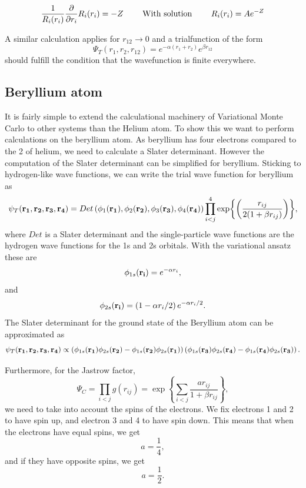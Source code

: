 \documentclass[11pt]{article}
\begin{document}
		\begin{align}
			 \frac{1}{R_i(r_i)} \pdv{}{r_i} R_i(r_i)	=  -Z  \qquad{ \text{ With solution }}  \qquad R_i(r_i) = A e^{-Z}
		\end{align}

		A similar calculation applies for \(r_{12} \rightarrow 0\) and a trialfunction of the form   \[\Psi_T(r_1,r_2,r_{12}) = e^{-\alpha (r_1 + r_2)} e^{\beta r_{12}} \] should fulfill the condition that the wavefunction is finite everywhere.




	\subsection{Beryllium atom}

		It is fairly simple to extend the calculational machinery of Variational
		Monte Carlo to other systems than the Helium atom. To show this we
		want to perform calculations on the beryllium atom. As beryllium has
		four electrons compared to the 2 of helium, we need to calculate a
		Slater determinant. However the computation of the Slater determinant
		can be simplified for beryllium. Sticking to hydrogen-like wave functions,
		we can write the trial wave function for beryllium as
		\begin{equation}
			\psi_{T}({\bf r_{1}},{\bf r_{2}},{\bf r_{3}},{\bf r_{4}})=Det\left(\phi_{1}({\bf r_{1}}),\phi_{2}({\bf r_{2}}),\phi_{3}({\bf r_{3}}),\phi_{4}({\bf r_{4}})\right)\prod_{i<j}^{4}\exp{\left(\frac{r_{ij}}{2(1+\beta r_{ij})}\right)},
		\end{equation}
		where $Det$ is a Slater determinant and the single-particle wave
		functions are the hydrogen wave functions for the 1s and 2s orbitals.
		With the variational ansatz these are
		\[
		\phi_{1s}({\bf r_{i}})=e^{-\alpha r_{i}},
		\]
		and 
		\[
		\phi_{2s}({\bf r_{i}})=\left(1-\alpha r_{i}/2\right)e^{-\alpha r_{i}/2}.
		\]
		The Slater determinant for the ground state of the Beryllium atom
		can be approximated as
		\[
		\psi_{T}({\bf r_{1}},{\bf r_{2}},{\bf r_{3}},{\bf r_{4}})\propto\left(\phi_{1s}({\bf r_{1}})\phi_{2s}({\bf r_{2}})-\phi_{1s}({\bf r_{2}})\phi_{2s}({\bf r_{1}})\right)\left(\phi_{1s}({\bf r_{3}})\phi_{2s}({\bf r_{4}})-\phi_{1s}({\bf r_{4}})\phi_{2s}({\bf r_{3}})\right).
		\]


		Furthermore, for the Jastrow factor, 
		\[
		\Psi_{C}=\prod_{i<j}g(r_{ij})=\exp{\left\{ \sum_{i<j}\frac{ar_{ij}}{1+\beta r_{ij}}\right\} },
		\]
		we need to take into account the spins of the electrons. We fix electrons
		1 and 2 to have spin up, and electron 3 and 4 to have spin down. This
		means that when the electrons have equal spins, we get
		\[
		a=\frac{1}{4},
		\]
		and if they have opposite spins, we get
		\[
		a=\frac{1}{2}.
		\]
\end{document}
